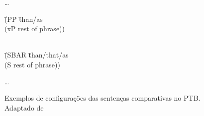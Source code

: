 \begin{figure}[!h]
    \centering
    \begin{minipage}{.3\linewidth}
        \ldots
        \begin{tabbing}
            \=(PP \=than/as\+\\
            \>    (xP rest of phrase))\\
            \>\\
        \end{tabbing}
        \begin{tabbing}
            \=(SBAR \=than/that/as\+\\
            \>    (S rest of phrase))\\
        \end{tabbing}
        \ldots
    \end{minipage}
    \caption[Exemplos de configurações das sentenças comparativas no PTB]{Exemplos de configurações das sentenças comparativas no PTB. Adaptado de \cite[p~284]{bracketing_ptb}}
    \label{fig:ptb_exemplo_comp}
\end{figure}



